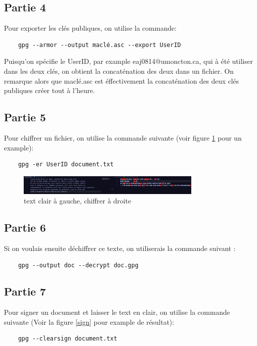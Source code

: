 \documentclass[12pt,a4paper]{article}
\begin{document}
\subsection{Partie 4}
Pour exporter les clés publiques, on utilise la commande:
\begin{verbatim}
    gpg --armor --output maclé.asc --export UserID
\end{verbatim}
Puisqu'on spécifie le UserID, par example eaj0814@umoncton.ca,
qui à été utiliser dans les deux clés, on obtient la concaténation des deux dans un fichier.
On remarque alors que maclé.asc est éffectivement la concaténation des deux clés publiques créer tout à l'heure.

\subsection{Partie 5}
Pour chiffrer un fichier, on utilise la commande suivante (voir figure \ref{chiffre} pour un example):
\begin{verbatim}
    gpg -er UserID document.txt
\end{verbatim}

\begin{figure}[ht]
    \centering
    \includegraphics[width=0.8\textwidth]{../img/chiffre.png}
    \caption{text clair à gauche, chiffrer à droite}
    \label{chiffre}
\end{figure}

\subsection{Partie 6}
Si on voulais ensuite déchiffrer ce texte, on utiliserais la commande suivant :
\begin{verbatim}
    gpg --output doc --decrypt doc.gpg
\end{verbatim}

\subsection{Partie 7}
Pour signer un document et laisser le text en clair, on utilise la commande suivante (Voir la figure \ref{sign} pour example de résultat):
\begin{verbatim}
    gpg --clearsign document.txt
\end{verbatim}
\end{document}
